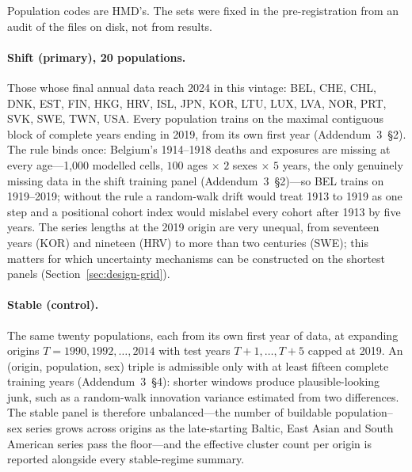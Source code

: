 Population codes are HMD's. The sets were fixed in the pre-registration from
an audit of the files on disk, not from results.

\paragraph{Shift (primary), 20 populations.} Those whose final annual data
reach 2024 in this vintage: BEL, CHE, CHL, DNK, EST, FIN, HKG, HRV, ISL, JPN,
KOR, LTU, LUX, LVA, NOR, PRT, SVK, SWE, TWN, USA. Every population trains on
the maximal contiguous block of complete years ending in 2019, from its own
first year (Addendum~3~\S2). The rule binds once: Belgium's 1914--1918
deaths and exposures are missing at every age---1{,}000 modelled cells,
$100$ ages $\times$ $2$ sexes $\times$ $5$ years, the only genuinely missing
data in the shift training panel (Addendum~3~\S2)---so BEL trains on
1919--2019; without the
rule a random-walk drift would treat 1913 to 1919 as one step and a
positional cohort index would mislabel every cohort after 1913 by five
years. The series lengths at the 2019 origin are very unequal, from
seventeen years (KOR) and nineteen (HRV) to more than two centuries (SWE);
this matters for which uncertainty mechanisms can be constructed on the
shortest panels (Section~\ref{sec:design-grid}).

\paragraph{Stable (control).} The same twenty populations, each from its own
first year of data, at expanding origins $T=1990,1992,\dots,2014$ with test
years $T+1,\dots,T+5$ capped at 2019. An (origin, population, sex) triple is
admissible only with at least fifteen complete training years
(Addendum~3~\S4): shorter windows produce plausible-looking junk, such as a
random-walk innovation variance estimated from two differences. The stable
panel is therefore unbalanced---the number of buildable population--sex
series grows across origins as the late-starting Baltic, East Asian and
South American series pass the floor---and the effective cluster count per
origin is reported alongside every stable-regime summary.

